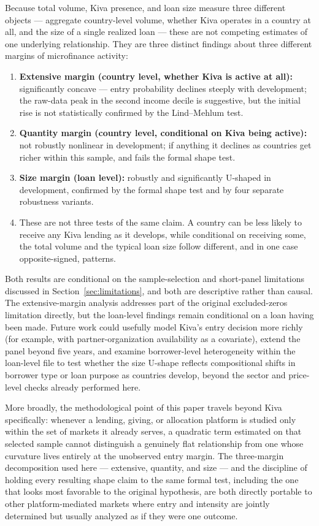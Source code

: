\documentclass[12pt]{article}
\begin{document}
Because total volume, Kiva presence, and loan size measure three different objects --- aggregate
country-level volume, whether Kiva operates in a country at all, and the size of a single realized
loan --- these are not competing estimates of one underlying relationship. They are three distinct
findings about three different margins of microfinance activity:
\begin{enumerate}
\item \textbf{Extensive margin (country level, whether Kiva is active at all):} significantly
  concave --- entry probability declines steeply with development; the raw-data peak in the second
  income decile is suggestive, but the initial rise is not statistically confirmed by the
  Lind--Mehlum test.
\item \textbf{Quantity margin (country level, conditional on Kiva being active):} not robustly
  nonlinear in development; if anything it declines as countries get richer within this sample, and
  fails the formal shape test.
\item \textbf{Size margin (loan level):} robustly and significantly U-shaped in development,
  confirmed by the formal shape test and by four separate robustness variants.
\item These are not three tests of the same claim. A country can be less likely to receive any Kiva
  lending as it develops, while conditional on receiving some, the total volume and the typical loan
  size follow different, and in one case opposite-signed, patterns.
\end{enumerate}

Both results are conditional on the sample-selection and short-panel limitations discussed in
Section~\ref{sec:limitations}, and both are descriptive rather than causal. The extensive-margin
analysis addresses part of the original excluded-zeros limitation directly, but the loan-level
findings remain conditional on a loan having been made. Future work could usefully model Kiva's entry
decision more richly (for example, with partner-organization availability as a covariate), extend the
panel beyond five years, and examine borrower-level heterogeneity within the loan-level file to test
whether the size U-shape reflects compositional shifts in borrower type or loan purpose as countries
develop, beyond the sector and price-level checks already performed here.

More broadly, the methodological point of this paper travels beyond Kiva specifically: whenever a
lending, giving, or allocation platform is studied only within the set of markets it already serves,
a quadratic term estimated on that selected sample cannot distinguish a genuinely flat relationship
from one whose curvature lives entirely at the unobserved entry margin. The three-margin decomposition
used here --- extensive, quantity, and size --- and the discipline of holding every resulting shape
claim to the same formal test, including the one that looks most favorable to the original hypothesis,
are both directly portable to other platform-mediated markets where entry and intensity are jointly
determined but usually analyzed as if they were one outcome.
\end{document}
